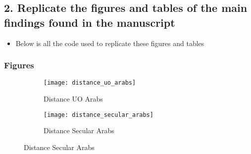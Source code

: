 \documentclass[12pt,letterpaper]{article}
\begin{document}
	
	\vspace{.25cm}
	\subsection*{2. Replicate the figures and tables of the main findings found in the manuscript}
	\begin{itemize}
		\item Below is all the code used to replicate these figures and tables
		
	\end{itemize}
	\newpage
	\subsubsection{Figures}
\begin{figure}[htbp]
	\begin{mdframed}[
		skipabove=0.5\baselineskip, %
		skipbelow=0.5\baselineskip, %
		linewidth=1pt, %
		innerleftmargin=10pt, %
		innerrightmargin=10pt, %
		innertopmargin=10pt, %
		innerbottommargin=10pt, %
		]
		\centering
		\caption{Social Distance by Group}
		\label{fig:Social Distance by Group}
		\begin{subfigure}[b]{0.4\textwidth} %
			\texttt{[image: distance\_uo\_arabs]}
			\caption{Distance UO Arabs}
			\label{fig:distance_uo_arabs}
		\end{subfigure}
		\hfill
		\begin{subfigure}[b]{0.4\textwidth} %
			\texttt{[image: distance\_secular\_arabs]}
			\caption{Distance Secular Arabs}
			\label{fig:distance_secular_arabs}
		\end{subfigure}
	\end{mdframed}
\end{figure}
	
\end{document}
